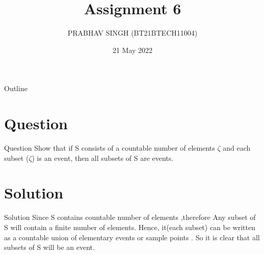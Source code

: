 \documentclass{beamer}
\title{Assignment 6}
\author{PRABHAV SINGH (BT21BTECH11004)}
\date{21 May 2022}
\begin{document}
	
	\begin{frame}
		\titlepage 
	\end{frame}
	
	\logo{}
	
	
	\begin{frame}{Outline}
		\tableofcontents
	\end{frame}
	
	\section{Question}
	\begin{frame}{Question}
	Show that if S consists of a countable number of elements $ \zeta  $ and each subset ($ \zeta $) is an event, 
	then all subsets of S are events.
		
	\end{frame}
	
	
	\section{Solution}
	\begin{frame}{Solution}
		Since S contains countable number of elements ,therefore Any subset of S will contain a finite number of elements. Hence, it(each subset) 
		can be written as a countable union of elementary events or sample points . So it is clear that all subsets of S will be an event.
\end{frame} 
\end{document}
